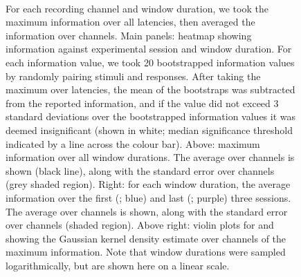 \begin{figure}[htbp]%
    \centering
    \hspace*{\fill}
    \hspace*{\fill}\hspace{.2cm}\hspace*{\fill}
    \hspace*{\fill}
    \\
    \hspace*{\fill}
    \hspace*{\fill}\hspace{.2cm}\hspace*{\fill}
    \hspace*{\fill}
    \caption{
For each recording channel and window duration, we took the maximum information over all latencies, then averaged the information over channels.
Main panels: heatmap showing information against experimental session and window duration.
For each information value, we took \num{20} bootstrapped information values by randomly pairing stimuli and responses.
After taking the maximum over latencies, the mean of the bootstraps was subtracted from the reported information, and if the value did not exceed \num{3} standard deviations over the bootstrapped information values it was deemed insignificant (shown in white; median significance threshold indicated by a line across the colour bar).
Above: maximum information over all window durations.
The average over channels is shown (black line), along with the standard error over channels (grey shaded region).
Right: for each window duration, the average information over the first (; blue) and last (; purple) three sessions.
The average over channels is shown, along with the standard error over channels (shaded region).
Above right: violin plots for  and  showing the Gaussian kernel density estimate over channels of the maximum information.
Note that window durations were sampled logarithmically, but are shown here on a linear scale.
    \label{fig:info_winlen}
}
\end{figure}

